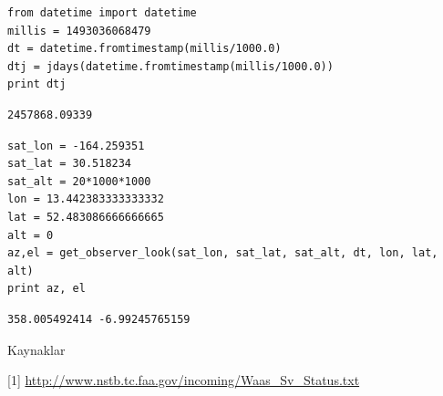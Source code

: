 \documentclass[12pt,fleqn]{article}\usepackage{../../common}
\begin{document}
\begin{verbatim}
from datetime import datetime
millis = 1493036068479
dt = datetime.fromtimestamp(millis/1000.0)
dtj = jdays(datetime.fromtimestamp(millis/1000.0))
print dtj
\end{verbatim}

\begin{verbatim}
2457868.09339
\end{verbatim}

\begin{verbatim}
sat_lon = -164.259351
sat_lat = 30.518234
sat_alt = 20*1000*1000
lon = 13.442383333333332
lat = 52.483086666666665
alt = 0
az,el = get_observer_look(sat_lon, sat_lat, sat_alt, dt, lon, lat, alt)
print az, el    
\end{verbatim}

\begin{verbatim}
358.005492414 -6.99245765159
\end{verbatim}









Kaynaklar 

[1] \url{http://www.nstb.tc.faa.gov/incoming/Waas_Sv_Status.txt}
\end{document}
